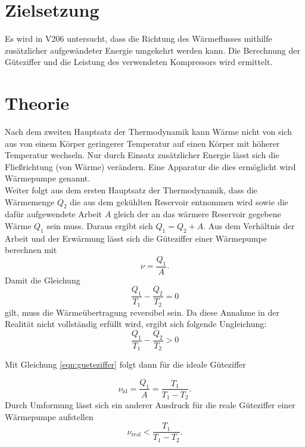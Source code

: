 \setcounter{page}{1}
\section{Zielsetzung}
\label{sec:Zielsetzung}

Es wird in V206 untersucht, dass die Richtung des Wärmeflusses mithilfe zusätzlicher aufgewändeter
Energie umgekehrt werden kann. Die Berechnung der Güteziffer und die Leistung des verwendeten Kompressors wird ermittelt.


\section{Theorie}
\label{sec:Theorie}
Nach dem zweiten Hauptsatz der Thermodynamik kann Wärme nicht von sich aus von einem Körper geringerer Temperatur auf einen Körper 
mit höherer Temperatur wechseln. Nur durch Einsatz zusätzlicher Energie lässt sich die Fließrichtung (von Wärme) verändern.
Eine Apparatur die dies ermöglicht wird Wärmepumpe genannt.\\
Weiter folgt aus dem ersten Hauptsatz der Thermodynamik, dass die Wärmemenge $Q_2$ die aus dem gekühlten Reservoir entnommen wird 
sowie die dafür aufgewendete Arbeit $A$ gleich der an das wärmere Reservoir gegebene Wärme $Q_1$ sein muss. Daraus ergibt sich $Q_1 = Q_2 + A .$
Aus dem Verhältnis der Arbeit und der Erwärmung lässt sich die Güteziffer einer Wärmepumpe berechnen mit
\begin{equation}\label{eqn:gueteziffer}
    ν = \frac{Q_1}{A} .
\end{equation}
Damit die Gleichung \begin{equation}\label{eqn:QVerhaeltnis} \frac{Q_1}{T_1} - \frac{Q_2}{T_2} = 0 \end{equation} gilt, muss die Wärmeübertragung reversibel sein. 
Da diese Annahme in der Realität nicht vollständig erfüllt wird, ergibt sich folgende Ungleichung:
\begin{equation}
    \frac{Q_1}{T_1} - \frac{Q_2}{T_2} > 0
\end{equation}

Mit Gleichung \eqref{eqn:gueteziffer} folgt dann für die ideale Güteziffer 

\begin{equation}\label{eqn:guetezfferIdeal}
    ν_{\text{id}} = \frac{Q_1}{A} = \frac{T_1}{T_1 - T_2}.
\end{equation}
Durch Umformung lässt sich ein anderer Ausdruck für die reale Güteziffer einer Wärmepumpe aufstellen
\begin{equation}\label{eqn:guetezifferReal}
    ν_{\text{real}} < \frac{T_1}{T_1 - T_2} .
\end{equation}


